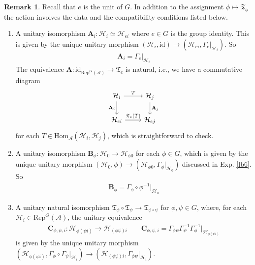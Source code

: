 \documentclass[11pt,b5paper,notitlepage]{article}
\theoremstyle{definition}
\newtheorem{rem}[df]{Remark}
\theoremstyle{plain}
\newcommand{\fk}{\mathfrak}
\newcommand{\id}{\mathrm{id}}
\newcommand{\Hom}{\mathrm{Hom}}
\newcommand{\RepGA}{\mathrm{Rep}^G(\mathcal A)}
\newcommand{\mbf}{\mathbf}
\newcommand{\MA}{\mathcal A}
\newcommand{\MH}{\mathcal H}
\numberwithin{equation}{section}
\begin{document}
\begin{rem}\label{lb7}
Recall that $e$ is the unit of $G$. In addition to the assignment $\phi\mapsto\fk T_\phi$ the action involves the data and the compatibility conditions listed below.
\begin{enumerate}[label=(\alph*)]
\item A unitary isomorphism $\mbf A_i:\MH_i\simeq\MH_{ei}$ where $e\in G$ is the group identity. This is given by the unique unitary morphism $(\MH_i,\id)\rightarrow(\MH_{ei},\Gamma_e|_{\MH_i})$. So
\begin{align*}
\mbf A_i=\Gamma_e|_{\MH_i}
\end{align*}
The equivalence $\mbf A:\id_{\RepGA}\rightarrow\fk T_e$ is natural, i.e., we have a commutative diagram
\begin{equation*}
\begin{tikzcd}
\MH_i \arrow[r,"T"] \arrow[d,"\mbf A_i"'] & \MH_j \arrow[d,"\mbf A_j"] \\
\MH_{ei} \arrow[r,"\fk T_e(T)"]           & \MH_{ej}       
\end{tikzcd}
\end{equation*}
for each $T\in\Hom_\MA(\MH_i,\MH_j)$, which is straightforward to check.
\item A unitary isomorphism $\mbf B_\phi:\MH_0\rightarrow\MH_{\phi0}$ for each $\phi\in G$, which is given by the unique unitary morphism $(\MH_0,\phi)\rightarrow(\MH_{\phi0},\Gamma_\phi|_{\MH_0})$ discussed in Exp. \ref{lb6}. So
\begin{align*}
\mbf B_\phi=\Gamma_\phi\circ\phi^{-1}|_{\MH_0}
\end{align*}
\item A unitary natural isomorphism $\fk T_\phi\circ\fk T_\psi\rightarrow\fk T_{\phi\circ\psi}$ for $\phi,\psi\in G$, where, for each $\MH_i\in\RepGA$, the unitary equivalence 
\begin{align*}
\mbf C_{\phi,\psi,i}:\MH_{\phi(\psi i)}\rightarrow \MH_{(\phi\psi)i}\qquad \mbf C_{\phi,\psi,i}=\Gamma_{\phi\psi}\Gamma_\psi^{-1}\Gamma_\phi^{-1}|_{\MH_{\phi(\psi i)}}
\end{align*}
is given by the unique unitary morphism $(\MH_{\phi(\psi i)},\Gamma_\phi\circ\Gamma_\psi|_{\MH_i})\rightarrow (\MH_{(\phi\psi)i},\Gamma_{\phi\psi}|_{\MH_i})$. 



\end{enumerate}
\end{rem}
\end{document}
